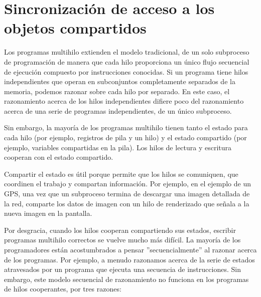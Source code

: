 \documentclass[10pt]{book}
\begin{document}
\chapter{Sincronización de acceso a los objetos compartidos}
Los programas multihilo extienden el modelo tradicional, de un solo subproceso de programación de manera que cada hilo proporciona un único flujo secuencial de ejecución compuesto por instrucciones conocidas. Si un programa tiene hilos independientes que operan en subconjuntos completamente separados de la memoria, podemos razonar sobre cada hilo por separado. En este caso, el razonamiento acerca de los hilos independientes difiere poco del razonamiento acerca de una serie de programas independientes, de un único subproceso.

Sin embargo, la mayoría de los programas multihilo tienen tanto el estado para cada hilo (por ejemplo, registros de pila y un hilo) y el estado compartido (por ejemplo, variables compartidas en la pila). Los hilos de lectura y escritura cooperan con el estado compartido.

Compartir el estado es útil porque permite que los hilos se comuniquen, que coordinen el trabajo y compartan información. Por ejemplo, en el ejemplo de un GPS, una vez que un subproceso termina de descargar una imagen detallada de la red, comparte los datos de imagen con un hilo de renderizado que señala a la nueva imagen en la pantalla.

Por desgracia, cuando los hilos cooperan compartiendo sus estados, escribir programas multihilo correctos se vuelve mucho más difícil. La mayoría de los programadores están acostumbrados a pensar ''secuencialmente'' al razonar acerca de los programas. Por ejemplo, a menudo razonamos acerca de la serie de estados atravesados por un programa que ejecuta una secuencia de instrucciones. Sin embargo, este modelo secuencial de razonamiento no funciona en los programas de hilos cooperantes, por tres razones:
\end{document}

